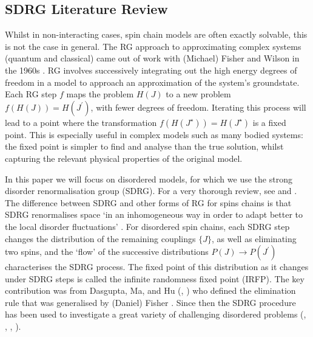 \subsection{SDRG Literature Review}\label{subsec:sdrg_lit}
Whilst in non-interacting cases, spin chain models are often exactly solvable, this is not the case in general. The RG approach to approximating complex systems (quantum and classical) came out of work with (Michael) Fisher and Wilson in the 1960s \cite{fisher_1998}. RG involves successively integrating out the high energy degrees of freedom in a model to approach an approximation of the system's groundstate. Each RG step $f$ maps the problem $H(J)$ to a new problem $f(H(J)) = H(J^\prime)$, with fewer degrees of freedom. Iterating this process will lead to a point where the transformation $f(H(J^\star)) = H(J^\star)$ is a fixed point. This is especially useful in complex models such as many bodied systems: the fixed point is simpler to find and analyse than the true solution, whilst capturing the relevant physical properties of the original model.


In this paper we will focus on disordered models, for which we use the strong disorder renormalisation group (SDRG). For a very thorough review, see \cite{Igloi2005} and \cite{Igloi2018}. The difference between SDRG and other forms of RG for spins chains is that SDRG renormalises space `in an inhomogeneous way in order to adapt better to the local disorder fluctuations' \cite{Igloi2005}. For disordered spin chains, each SDRG step changes the distribution of the remaining couplings $\{J\}$, as well as eliminating two spins, and the `flow' of the successive distributions $P(J) \rightarrow P(J^\prime)$ characterises the SDRG process. The fixed point of this distribution as it changes under SDRG steps is called the infinite randomness fixed point (IRFP). The key contribution was from Dasgupta, Ma, and Hu (\cite{dasgupta_ma}, \cite{dasgupta_ma_1980}) who defined the elimination rule that was generalised by (Daniel) Fisher \cite{Fisher1994}. Since then the SDRG procedure has been used to investigate a great variety of challenging disordered problems (\cite{bouchard_diffusion}, \cite{motrunich_1999}, \cite{monthus_polymers_2000}, \cite{refael2004}). 

